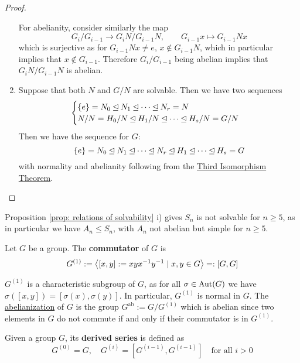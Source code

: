 \begin{proof}
\begin{enumerate}[label=\roman*)]
        For abelianity, consider similarly the map 
        \[
            G_i/G_{i-1} \to G_i N/G_{i-1} N, \qquad G_{i-1}x\mapsto G_{i-1}Nx
        \]
        which is surjective as for $G_{i-1}Nx \neq e$, $x \notin G_{i-1}N$, which in particular implies that $x \notin G_{i-1}$. Therefore $G_i/G_{i-1}$ being abelian implies that $G_i N/G_{i-1} N$ is abelian.
        \item Suppose that both $N$ and $G/N$ are solvable. Then we have two sequences
        \[
            \begin{cases}
                \{e\} = N_0 \unlhd N_1 \unlhd \cdots \unlhd N_r = N \\
                N/N = H_0/N \unlhd H_1/N \unlhd \cdots \unlhd H_s/N = G/N
            \end{cases}
        \]
        Then we have the sequence for $G$:
        \[
            \{e\} = N_0 \unlhd N_1 \unlhd \cdots \unlhd N_r \unlhd H_1 \unlhd \cdots \unlhd H_s = G
        \]
        with normality and abelianity following from the \hyperref[thm: third isomorphism theorem]{Third Isomorphism Theorem}.
    \end{enumerate}
\end{proof}

\begin{corollary}
    Proposition \ref{prop: relations of solvability} i) gives $S_n$ is not solvable for $n \geq 5$, as in particular we have $A_n \leq S_n$, with $A_n$ not abelian but simple for $n \geq 5$.
\end{corollary}

\begin{definition}[Commutator]
    Let $G$ be a group. The \textbf{commutator} of $G$ is 
    \[
        G^{(1)} := \left\langle [x, y] := x y x^{-1} y^{-1} \mid x, y \in G \right\rangle =: [G, G]
    \]
\end{definition}

\begin{remark}\label{rmk: abelianization}
    $G^{(1)}$ is a characteristic subgroup of $G$, as for all $\sigma \in \mathrm{Aut}(G)$ we have $\sigma([x, y]) = [\sigma(x), \sigma(y)]$. In particular, $G^{(1)}$ is normal in $G$. The \underline{abelianization} of $G$ is the group $G^{\mathrm{ab}} := G/G^{(1)}$ which is abelian since two elements in $G$ do not commute if and only if their commutator is in $G^{(1)}$.
\end{remark}

\begin{definition}
    Given a group $G$, its \textbf{derived series} is defined as
    \[
        G^{(0)} = G, \quad G^{(i)} = [G^{(i-1)}, G^{(i-1)}] \quad \text{for all $i > 0$}
    \]
\end{definition}

